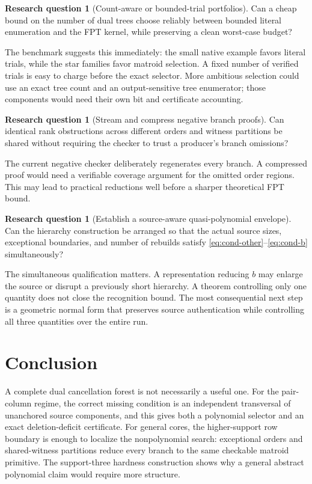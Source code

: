 \documentclass[11pt,letterpaper]{article}
\theoremstyle{definition}
\newtheorem{question}[theorem]{Research question}
\theoremstyle{remark}
\begin{document}
\begin{question}[Count-aware or bounded-trial portfolios]
Can a cheap bound on the number of dual trees choose reliably between bounded
literal enumeration and the FPT kernel, while preserving a clean worst-case
budget?
\end{question}
The benchmark suggests this immediately: the small native example favors
literal trials, while the star families favor matroid selection. A fixed number
of verified trials is easy to charge before the exact selector. More ambitious
selection could use an exact tree count and an output-sensitive tree enumerator;
those components would need their own bit and certificate accounting.

\begin{question}[Stream and compress negative branch proofs]
Can identical rank obstructions across different orders and witness partitions
be shared without requiring the checker to trust a producer's branch omissions?
\end{question}
The current negative checker deliberately regenerates every branch. A compressed
proof would need a verifiable coverage argument for the omitted order regions.
This may lead to practical reductions well before a sharper theoretical FPT bound.

\begin{question}[Establish a source-aware quasi-polynomial envelope]
Can the hierarchy construction be arranged so that the actual source sizes,
exceptional boundaries, and number of rebuilds satisfy
\eqref{eq:cond-other}--\eqref{eq:cond-b} simultaneously?
\end{question}
The simultaneous qualification matters. A representation reducing $b$ may enlarge
the source or disrupt a previously short hierarchy. A theorem controlling only
one quantity does not close the recognition bound. The most consequential next
step is a geometric normal form that preserves source authentication while
controlling all three quantities over the entire run.

\section{Conclusion}
A complete dual cancellation forest is not necessarily a useful one. For the
pair-column regime, the correct missing condition is an independent transversal
of unanchored source components, and this gives both a polynomial selector and
an exact deletion-deficit certificate. For general cores, the higher-support row
boundary is enough to localize the nonpolynomial search: exceptional orders and
shared-witness partitions reduce every branch to the same checkable matroid
primitive. The support-three hardness construction shows why a general abstract
polynomial claim would require more structure.
\end{document}
